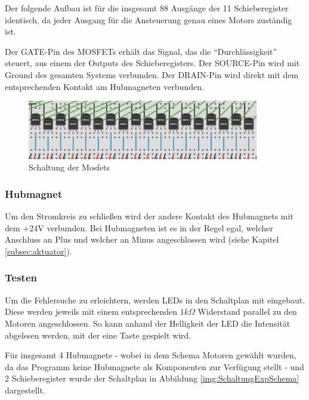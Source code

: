 Der folgende Aufbau ist für die insgesamt 88 Ausgänge der 11 Schieberegister identisch, da jeder Ausgang für die Ansteuerung genau eines Motors zuständig ist.

Der GATE-Pin des MOSFETs erhält das Signal, das die \enquote{Durchlässigkeit} steuert, aus einem der Outputs des Schieberegisters.
Der SOURCE-Pin wird mit Ground des gesamten Systems verbunden.
Der DRAIN-Pin wird direkt mit dem entsprechenden Kontakt am Hubmagneten verbunden.

\begin{figure}[htbp]
	\centering
	\includegraphics[width=0.9\textwidth]{img/MosSchaltung}
	\caption{Schaltung der Mosfets}
	\label{fig:SchaltungMosfet}
\end{figure}

\subsubsection{Hubmagnet}

Um den Stromkreis zu schließen wird der andere Kontakt des Hubmagnets mit dem +24V verbunden.
Bei Hubmagneten ist es in der Regel egal, welcher Anschluss an Plus und welcher an Minus angeschlossen wird (siehe Kapitel \ref{subsec:aktuator}). %

\subsubsection{Testen}

Um die Fehlersuche zu erleichtern, werden LEDs in den Schaltplan mit eingebaut.
Diese werden jeweils mit einem entsprechenden $1k\Omega$ Widerstand parallel zu den Motoren angeschlossen.
So kann anhand der Helligkeit der LED die Intensität abgelesen werden, mit der eine Taste gespielt wird.

Für insgesamt 4 Hubmagnete - wobei in dem Schema Motoren gewählt wurden, da das Programm keine Hubmagnete als Komponenten zur Verfügung stellt - und 2 Schieberegister wurde der Schaltplan in Abbildung \ref{img:SchaltungExpSchema} dargestellt.

